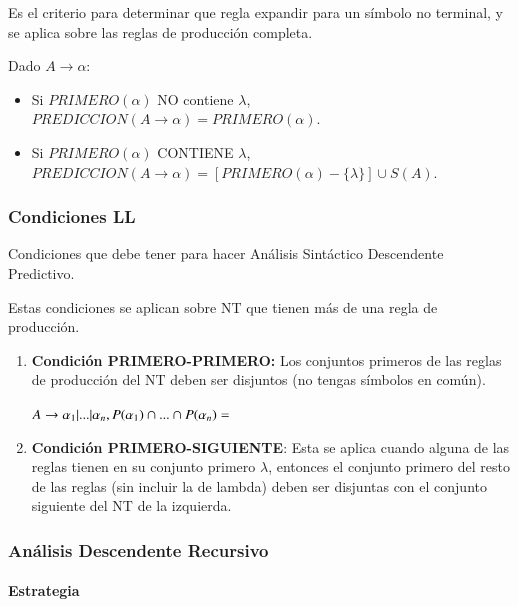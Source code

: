 \documentclass[12pt]{report} %
\begin{document}
Es el criterio para determinar que regla expandir para un símbolo no
terminal, y se aplica sobre las reglas de producción completa.

Dado \(A \rightarrow \alpha\):

\begin{itemize}

\item
  Si \(PRIMERO(\alpha)\) NO contiene \(\lambda\),
  \(PREDICCION(A \rightarrow \alpha) = PRIMERO(\alpha)\).
\item
  Si \(PRIMERO(\alpha)\) CONTIENE \(\lambda\),
  \(PREDICCION(A\rightarrow\alpha) = [PRIMERO(\alpha)-\{\lambda\}] \cup S(A)\).
\end{itemize}


\subsubsection{Condiciones LL}

Condiciones que debe tener para hacer Análisis Sintáctico Descendente
Predictivo.

Estas condiciones se aplican sobre NT que tienen más de una regla de
producción.

\begin{enumerate}
\def\labelenumi{\arabic{enumi}.}

\item
  \textbf{Condición PRIMERO-PRIMERO:} Los conjuntos primeros de las
  reglas de producción del NT deben ser disjuntos (no tengas símbolos en
  común).

  \(A \rightarrow \alpha_1 |...|\alpha_n, P(\alpha_1) \cap ... \cap P(\alpha_n) = \empty\)
\item
  \textbf{Condición PRIMERO-SIGUIENTE}: Esta se aplica cuando alguna de
  las reglas tienen en su conjunto primero \(\lambda\), entonces el
  conjunto primero del resto de las reglas (sin incluir la de lambda)
  deben ser disjuntas con el conjunto siguiente del NT de la izquierda.
\end{enumerate}


\subsubsection{Análisis Descendente Recursivo}


\paragraph{Estrategia}
\end{document}
